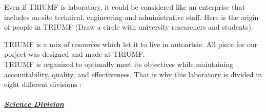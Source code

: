 \documentclass[a4paper, 11pt]{report}%
\begin{document}
  Even if TRIUMF is laboratory, it could be considered like an enterprise that includes on-site technical, engineering and administrative
  staff. Here is the origin of people in TRIUMF (Draw a circle with university researchers and students). 
  
  TRIUMF is a mix of resources  which let it to live in autoartsie. All piece for our porject was designed and made at TRIUMF. 
  \\
  
  
  TRIUMF is organized to optimally meet its objectives while maintaining accountability, quality, and effectiveness. That is why this laboratory is divided
  in eight different divisions :
  
  \paragraph{\underline{\emph{Science Division}}}
    
\end{document}
